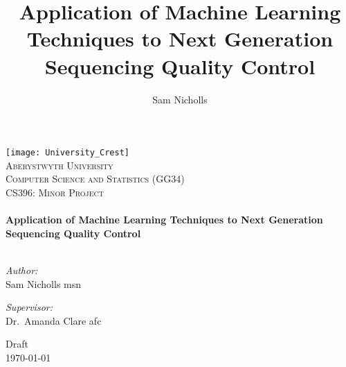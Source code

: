 \documentclass[a4paper,times,numbered,print,index,oneside,PageStyleII,parskip=full]{Classes/PhDThesisPSnPDF}
\title{Application of Machine Learning Techniques to Next Generation Sequencing Quality Control}
\author{Sam Nicholls}
\begin{document}
\frontmatter

\begin{titlepage}
\begin{center}

\texttt{[image: University\_Crest]}~\\[1cm]

\textsc{\huge Aberystwyth University}\\
\textsc{Computer Science and Statistics (GG34)}\\
\textsc{\Large CS396: Minor Project}\\[1.5cm]

\HRule \\[0.4cm]
{ \huge \bfseries Application of Machine Learning Techniques to Next Generation Sequencing Quality Control \\[0.5cm] }
\HRule \\[1.5cm]

\begin{minipage}{0.4\textwidth}
    \begin{flushleft} \large
        \emph{Author:}\\
        Sam Nicholls \small{msn}
    \end{flushleft}
\end{minipage}
\begin{minipage}{0.4\textwidth}
    \begin{flushright} \large
        \emph{Supervisor:} \\
        Dr.~Amanda Clare \small{afc}
    \end{flushright}
\end{minipage}


\vfill
Draft\\
{\large \today}

\end{center}
\end{titlepage}


%






\end{document}
